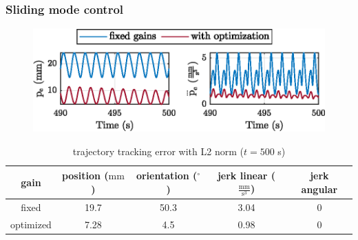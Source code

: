 	\begin{frame}
		\frametitle{Sliding mode control}
		\graphicspath{{images/methodology/SMC/exp1/circular/uncertainty_100_alpha_0.005/}}
		\begin{figure}
			\centering
			\includegraphics{pe_cartesian.eps}
		\end{figure}

		\begin{table}
			\caption{trajectory tracking error with L2 norm ($t=500$ s)}
			\centering
			\begin{tabular}{c c c c c}
			\toprule
			gain & position ($\mathrm{mm}$) & orientation ($^\circ$) & jerk linear ($\mathrm{\frac{mm}{s^3}}$) & jerk angular \\
			\midrule
			fixed  & 19.7 & 50.3 & 3.04 & 0 \\ 
			optimized & 7.28 & 4.5 & 0.98 & 0  \\
			\bottomrule
			\end{tabular}
		\end{table}		
	\end{frame}	



